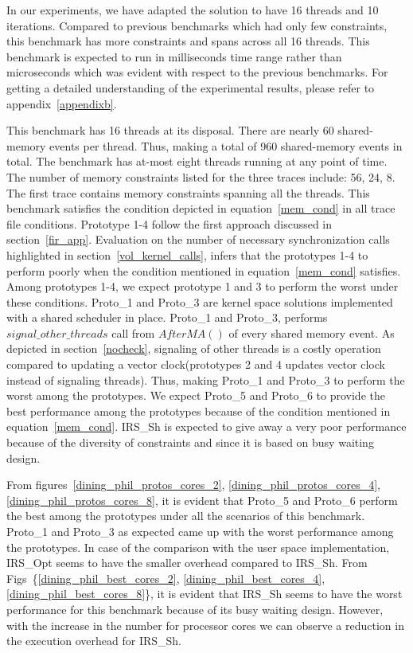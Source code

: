 {In our experiments, we have adapted the solution to have 16 threads and 10 iterations. 
Compared to previous benchmarks which had only few constraints, this benchmark has more constraints and spans across all 16 threads. 
This benchmark is expected to run in milliseconds time range rather than microseconds which was evident with respect to the previous benchmarks. 
For getting a detailed understanding of the experimental results, please refer to appendix~\ref{appendixb}.  

This benchmark has 16 threads at its disposal. 
There are nearly 60 shared-memory events per thread. 
Thus, making a total of 960 shared-memory events in total. 
The benchmark has at-most eight threads running at any point of time. 
The number of memory constraints listed for the three traces include: 56, 24, 8. 
The first trace contains memory constraints spanning all the threads.
This benchmark satisfies the condition depicted in equation~\ref{mem_cond} in all trace file conditions. 
Prototype 1-4 follow the first approach discussed in section~\ref{fir_app}. 
Evaluation on the number of necessary synchronization calls highlighted in section~\ref{vol_kernel_calls}, infers that the prototypes 1-4 to perform poorly when the condition mentioned in equation~\ref{mem_cond} satisfies. 
Among prototypes 1-4, we expect prototype 1 and 3 to perform the worst under these conditions. 
Proto\_1 and Proto\_3 are kernel space solutions implemented with a shared scheduler in place. 
Proto\_1 and Proto\_3, performs $signal\_other\_threads$ call from $AfterMA()$ of every shared memory event. 
As depicted in section~\ref{nocheck}, signaling of other threads is a costly operation compared to updating a vector clock(prototypes 2 and 4 updates vector clock instead of signaling threads). 
Thus, making Proto\_1 and Proto\_3 to perform the worst among the prototypes. 
We expect Proto\_5 and Proto\_6 to provide the best performance among the prototypes because of the condition mentioned in equation~\ref{mem_cond}.
IRS\_Sh is expected to give away a very poor performance because of the diversity of constraints and since it is based on busy waiting design.  

From figures~\ref{dining_phil_protos_cores_2}, \ref{dining_phil_protos_cores_4}, \ref{dining_phil_protos_cores_8}, it is evident that Proto\_5 and Proto\_6 perform the best among the prototypes under all the scenarios of this benchmark. 
Proto\_1 and Proto\_3 as expected came up with the worst performance among the prototypes. 
In case of the comparison with the user space implementation, IRS\_Opt seems to have the smaller overhead compared to IRS\_Sh. 
From Figs~\{\ref{dining_phil_best_cores_2}, \ref{dining_phil_best_cores_4}, \ref{dining_phil_best_cores_8}\}, it is evident that IRS\_Sh seems to have the worst performance for this benchmark because of its busy waiting design. 
However, with the increase in the number for processor cores we can observe a reduction in the execution overhead for IRS\_Sh. 

}
